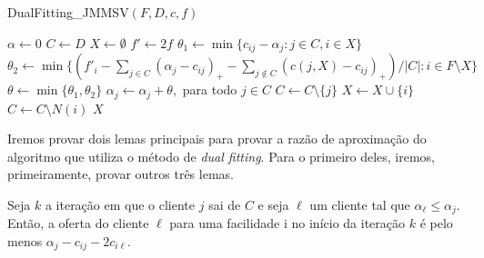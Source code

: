 \begin{algorithm}
    \caption{DualFitting\_JMMSV$(F,D,c,f)$}
    \begin{algorithmic}[1]
    \State $\alpha \gets 0$
    \State $C \gets D$
    \State $X \gets \emptyset$
    \State $f' \gets 2f$
    \State $\theta_1 \gets \min\{c_{ij} - \alpha_j:j \in C,i\in X\}$
    \State $\theta_2 \gets \min\{(f'_i - \sum_{j \in C}(\alpha_j - c_{ij})_+ - \sum_{j \not \in C}(c(j,X) - c_{ij})_+)/|C|: i \in F \setminus X\}$
    \State $\theta \gets \min\{\theta_1,\theta_2\}$
    \State $\alpha_j \gets \alpha_j + \theta,$ para todo $j \in C$
    \State $C \gets C \setminus \{j\}$
    \EndIf
    \State $X \gets X \cup \{i\}$
    \State $C \gets C\setminus N(i)$
    \EndIf
    \EndWhile
    \State \Return $X$
    \end{algorithmic}
\end{algorithm}
Iremos provar dois lemas principais para provar a razão de aproximação do algoritmo que utiliza o método de \emph{dual fitting}.
Para o primeiro deles, iremos, primeiramente, provar outros três lemas.

\begin{lemma}
    \label{upbound_bid}
    Seja $k$ a iteração em que o cliente $j$ sai de $C$ e seja $\ell$ um cliente tal que $\alpha_\ell \leq \alpha_j$. Então, a oferta do cliente $\ell$ para uma facilidade i no início da iteração $k$ é pelo menos $\alpha_j - c_{ij} - 2c_{i\ell}$.
\end{lemma}

